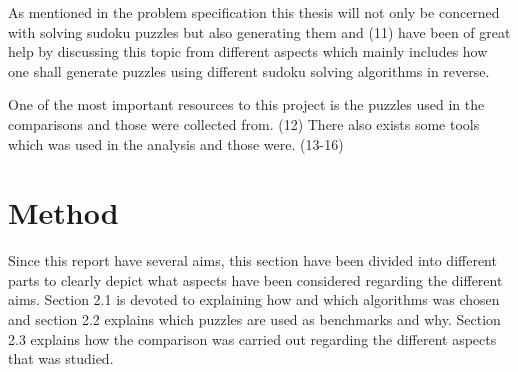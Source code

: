 \documentclass[a4paper,11pt]{kth-mag}
\begin{document}
As mentioned in the problem specification this thesis will not only be concerned with solving sudoku puzzles but also generating them and (11) have been of great help by discussing this topic from different aspects which mainly includes how one shall generate puzzles using different sudoku solving algorithms in reverse.

One of the most important resources to this project is the puzzles used in the comparisons and those were collected from. (12) There also exists some tools which was used in the analysis and those were. (13-16)



\chapter{Method}
Since this report have several aims, this section have been divided into different parts to clearly depict what aspects have been considered regarding the different aims. Section 2.1 is devoted to explaining how and which algorithms was chosen and section 2.2 explains which puzzles are used as benchmarks and why. Section 2.3 explains how the comparison was carried out regarding the different aspects that was studied.
\end{document}

